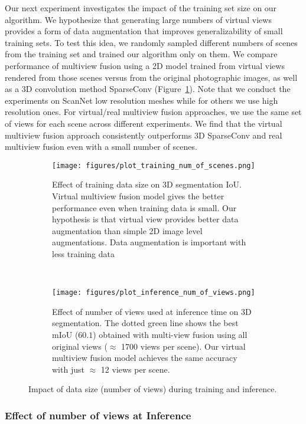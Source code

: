 \documentclass[runningheads]{llncs}
\begin{document}
Our next experiment investigates the impact of the training set size on our algorithm.  We hypothesize that generating large numbers of virtual views provides a form of data augmentation that improves generalizability of small training sets.   To test this idea, we randomly sampled different numbers of scenes from the training set and trained our algorithm only on them.   We compare performance of multiview fusion using a 2D model trained from virtual views rendered from those scenes versus from the original photographic images, as well as a 3D convolution method SparseConv (Figure~\ref{fig:train_size}). Note that we conduct the experiments on ScanNet low resolution meshes while for others we use high resolution ones. For virtual/real multiview fusion approaches, we use the same set of views for each scene across different experiments.  We find that the virtual multiview fusion approach consistently outperforms 3D SparseConv and real multiview fusion even with a small number of scenes.

\begin{figure}[bt]
\centering
  \begin{subfigure}[b]{0.48\textwidth}
    \texttt{[image: figures/plot\_training\_num\_of\_scenes.png]}
    \caption{Effect of training data size on 3D segmentation IoU. Virtual multiview fusion model gives the better performance even when training data is small. Our hypothesis is that virtual view provides better data augmentation than simple 2D image level augmentations. Data augmentation is important with less training data}
    \label{fig:train_size}
  \end{subfigure}
~
  \begin{subfigure}[b]{0.48\textwidth}
    \texttt{[image: figures/plot\_inference\_num\_of\_views.png]}
    \caption{Effect of number of views used at inference time on 3D segmentation. The dotted green line shows the best mIoU ($60.1$) obtained with multi-view fusion using all original views ($\approx$ 1700 views per scene). Our virtual multiview fusion model achieves the same accuracy with just $\approx$ 12 views per scene.}
    \label{fig:inference_size}
  \end{subfigure}
  \caption{Impact of data size (number of views) during training and inference.}
\end{figure}


\subsubsection{Effect of number of views at Inference}
\end{document}
